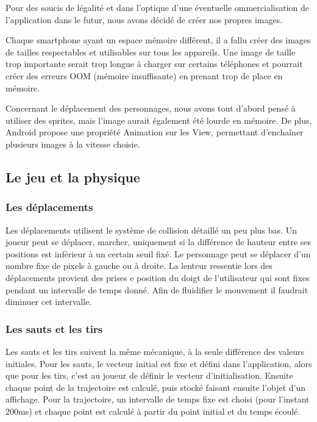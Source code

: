 \documentclass{report}
\begin{document}
Pour des soucis de légalité et dans l’optique d’une éventuelle
ommercialisation de l’application dans le futur, nous avons décidé de
créer nos propres images.

Chaque smartphone ayant un espace mémoire différent, il a fallu créer
des images de tailles respectables et utilisables sur tous les
appareils. Une image de taille trop importante serait trop longue à
charger sur certains téléphones et pourrait créer des erreurs OOM
(mémoire insuffisante) en prenant trop de place en mémoire.

Concernant le déplacement des personnages, nous avons tout d’abord pensé
à utiliser des sprites, mais l’image aurait également été lourde en
mémoire. De plus, Android propose une propriété Animation sur les View,
permettant d'enchaîner plusieurs images à la vitesse choisie.

\subsection{Le jeu et la physique}

\subsubsection{Les déplacements}

Les déplacements utilisent le système de collision détaillé un peu plus
bas. Un joueur peut se déplacer, marcher, uniquement si la différence de
hauteur entre ses positions est inférieur à un certain seuil fixé. Le
personnage peut se déplacer d’un nombre fixe de pixels à gauche ou à
droite. La lenteur ressentie lors des déplacements provient des prises
e position du doigt de l’utilisateur qui sont fixes pendant un
intervalle de temps donné. Afin de fluidifier le mouvement il faudrait
diminuer cet intervalle.

\subsubsection{Les sauts et les tirs}
Les sauts et les tirs suivent la même mécanique, à la seule différence
des valeurs initiales. Pour les sauts, le vecteur initial est fixe et
défini dans l’application, alors que pour les tirs, c’est au joueur de 
définir le vecteur d’initialisation. Ensuite chaque point de la 
trajectoire est calculé, puis stocké faisant ensuite l’objet d’un 
affichage. Pour la trajectoire, un intervalle de temps fixe est choisi 
(pour l’instant 200ms) et chaque point est calculé à partir du point 
initial et du temps écoulé.
\end{document}
